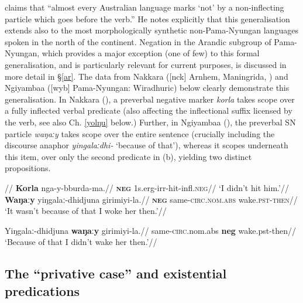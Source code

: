 \citet[82]{Dixon2002a} claims that ``almost every Australian language marks `not' by a non-inflecting particle which goes before the verb.'' He notes explicitly that this generalisation extends also to the most morphologically synthetic non-Pama-Nyungan languages spoken in the north of the continent. Negation in the Arandic subgroup of Pama-Nyungan, which provides a major exception (one of few) to this formal generalisation, and is particularly relevant for current purposes, is discussed in more detail in §\ref{ar}. The data from Nakkara ([\gls{nck}] Arnhem, Maningrida, \citealt[191]{Eather2011}) and Ngiyambaa ([\gls{wyb}] Pama-Nyungan: Wiradhuric) below clearly demonstrate this generalisation. In Nakkara (), a preverbal negative marker \textit{korla} takes scope over a fully inflected verbal predicate (also affecting the inflectional suffix licensed by the verb, see also Ch. \ref{yolŋu} below.)
Further, in Ngiyambaa (), the preverbal SN particle \textit{waŋaːy} takes scope over the entire sentence (crucially including the discourse anaphor \textit{yingalaːdhi-} `because of that'), whereas it scopes underneath this item, over only the second predicate in (b), yielding two distinct propositions. 

\pex\begingl\glpreamble {} //
\gla \textbf{Korla} nga-y-bburda-ma.//
\glb \textsc{\textbf{neg}} 1s.\gls{erg}-\gls{irr}-hit-\gls{infl}.\textsc{neg}//
\glft`I didn't hit him.'//\endgl\xe
\pex{}
\a{}\begingl\gla \textbf{Waŋaːy} yiŋgalaː-dhi\textdblhyphen dju\textdblhyphen na girimiyi-la.//
\glb \textsc{\textbf{neg}} same-\textsc{circ}.\textsc{nom}.\textsc{abs} wake\textsc{.pst-then}//
\glft`It wasn't because of that I woke her then.'//\endgl

\a\label{wyb2}\begingl\gla Yiŋgalaː-dhi\textdblhyphen dju\textdblhyphen na \textbf{waŋaːy} girimiyi-la.//
\glb same-\textsc{circ}.\gls{nom}.\gls{abs} \textbf{\gls{neg}} wake.\gls{pst}-then//
\glft`Because of that I didn't wake her then.'//\endgl
\xe
\subsection{The ``privative case'' and existential predications}\label{priv-sems}

